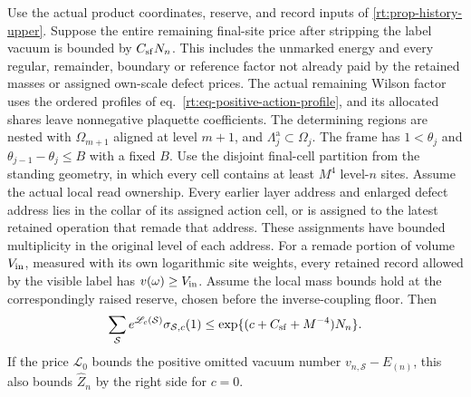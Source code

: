 \documentclass[11pt,letterpaper,reqno]{amsart}
\makeatletter
\numberwithin{equation}{section}
\renewcommand{\eqref}[1]{\textup{eq.~\ref{#1}}}
\theoremstyle{definition}
\newcommand{\ms@minorstart}{%
  \pushQED{\qed}\renewcommand{\qedsymbol}{$\blacksquare$}}
\newenvironment{proposition}[1][]{\ms@minorstart\ms@proposition[#1]}
  {\popQED\endms@proposition}
\theoremstyle{remark}
\makeatother
\begin{document}
\begin{proposition}[The loaded history estimate]
\label{rt:prop-loaded-upper}
Use the actual product coordinates, reserve, and record inputs
of \cref{rt:prop-history-upper}. Suppose the entire remaining
final-site price after stripping the label vacuum is bounded by
\(C_{\rm sf}N_n\). This includes the unmarked energy and every
regular, remainder, boundary or reference factor not already paid
by the retained masses or assigned own-scale defect prices.
The actual remaining Wilson factor uses the ordered profiles of
\eqref{rt:eq-positive-action-profile}, and its allocated shares
leave nonnegative plaquette coefficients.
The determining regions
are nested with \(\Omega_{m+1}\) aligned at level \(m+1\),
and \(\Lambda_j^{\mathrm a}\subset\Omega_j\).
The frame has \(1<\theta_j\) and
\(\theta_{j-1}-\theta_j\le B\) with a fixed \(B\).
Use the disjoint final-cell partition from the standing geometry,
in which every cell contains at least \(M^4\) level-\(n\) sites.
Assume the actual local read ownership. Every earlier layer
address and enlarged defect address lies in the collar of its
assigned action cell, or is assigned to the latest retained
operation that remade that address. These assignments have
bounded multiplicity in the original level of each address.
For a remade portion of volume \(V_{\rm in}\), measured
with its own logarithmic site weights, every retained record
allowed by the visible label has \(v(\omega)\ge V_{\rm in}\).
Assume the local mass bounds hold at the correspondingly raised
reserve, chosen before the inverse-coupling floor. Then
\begin{equation}\label{rt:eq-loaded-label-sum}
 \sum_{\mathcal S} e^{\mathscr L_c(\mathcal S)}
                   \sigma_{\mathcal S,c}(1)
       \le \exp\{(c+C_{\rm sf}+M^{-4})N_n\}.
\end{equation}
If the price \(\mathscr L_0\) bounds the positive omitted
vacuum number \(v_{n,\mathcal S}-E_{(n)}\), this also bounds
\(\widehat Z_n\) by the right side for \(c=0\).
\end{proposition}
\end{document}
